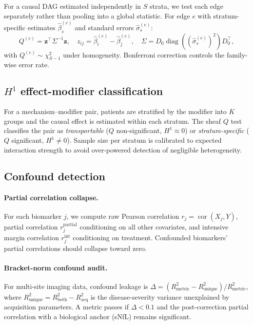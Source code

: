 \documentclass[11pt]{article}
\begin{document}
For a causal DAG estimated independently in $S$ strata, we test each edge separately rather than pooling into a global statistic.
For edge $e$ with stratum-specific estimates $\hat\beta_s^{(e)}$ and standard errors $\hat\sigma_s^{(e)}$:
\begin{equation}
    Q^{(e)} = \mathbf{z}^\top \Sigma^{-1} \mathbf{z}, \quad
    z_{ij} = \hat\beta_i^{(e)} - \hat\beta_j^{(e)}, \quad
    \Sigma = D_0 \operatorname{diag}((\hat\sigma_s^{(e)})^2) D_0^\top,
\end{equation}
with $Q^{(e)} \sim \chi^2_{S-1}$ under homogeneity.
Bonferroni correction controls the family-wise error rate.

\subsection{$H^1$ effect-modifier classification}
\label{sec:meth-h1}

For a mechanism--modifier pair, patients are stratified by the modifier into $K$ groups and the causal effect is estimated within each stratum.
The sheaf $Q$ test classifies the pair as \emph{transportable} ($Q$ non-significant, $H^1 \approx 0$) or \emph{stratum-specific} ($Q$ significant, $H^1 \neq 0$).
Sample size per stratum is calibrated to expected interaction strength to avoid over-powered detection of negligible heterogeneity.

\subsection{Confound detection}
\label{sec:meth-confound}

\paragraph{Partial correlation collapse.}
For each biomarker $j$, we compute raw Pearson correlation $r_j = \operatorname{cor}(X_j, Y)$, partial correlation $r_j^{\mathrm{partial}}$ conditioning on all other covariates, and intensive margin correlation $r_j^{\mathrm{int}}$ conditioning on treatment.
Confounded biomarkers' partial correlations should collapse toward zero.

\paragraph{Bracket-norm confound audit.}
For multi-site imaging data, confound leakage is $\Delta = (R^2_{\mathrm{metric}} - R^2_{\mathrm{unique}}) / R^2_{\mathrm{metric}}$, where $R^2_{\mathrm{unique}} = R^2_{\mathrm{both}} - R^2_{\mathrm{acq}}$ is the disease-severity variance unexplained by acquisition parameters.
A metric passes if $\Delta < 0.1$ and the post-correction partial correlation with a biological anchor (sNfL) remains significant.
\end{document}
